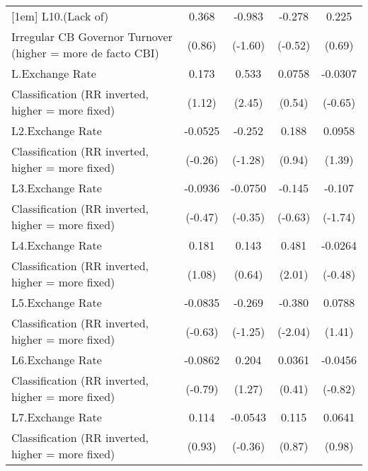 {\begin{tabular}{l*{4}{c}}
[1em]
L10.(Lack of)       &       0.368         &      -0.983         &      -0.278         &       0.225         \\
Irregular CB Governor Turnover (higher = more de facto CBI)&      (0.86)         &     (-1.60)         &     (-0.52)         &      (0.69)         \\
[1em]
L.Exchange Rate     &       0.173         &       0.533\sym{*}  &      0.0758         &     -0.0307         \\
Classification (RR inverted, higher = more fixed)&      (1.12)         &      (2.45)         &      (0.54)         &     (-0.65)         \\
[1em]
L2.Exchange Rate    &     -0.0525         &      -0.252         &       0.188         &      0.0958         \\
Classification (RR inverted, higher = more fixed)&     (-0.26)         &     (-1.28)         &      (0.94)         &      (1.39)         \\
[1em]
L3.Exchange Rate    &     -0.0936         &     -0.0750         &      -0.145         &      -0.107         \\
Classification (RR inverted, higher = more fixed)&     (-0.47)         &     (-0.35)         &     (-0.63)         &     (-1.74)         \\
[1em]
L4.Exchange Rate    &       0.181         &       0.143         &       0.481\sym{*}  &     -0.0264         \\
Classification (RR inverted, higher = more fixed)&      (1.08)         &      (0.64)         &      (2.01)         &     (-0.48)         \\
[1em]
L5.Exchange Rate    &     -0.0835         &      -0.269         &      -0.380\sym{*}  &      0.0788         \\
Classification (RR inverted, higher = more fixed)&     (-0.63)         &     (-1.25)         &     (-2.04)         &      (1.41)         \\
[1em]
L6.Exchange Rate    &     -0.0862         &       0.204         &      0.0361         &     -0.0456         \\
Classification (RR inverted, higher = more fixed)&     (-0.79)         &      (1.27)         &      (0.41)         &     (-0.82)         \\
[1em]
L7.Exchange Rate    &       0.114         &     -0.0543         &       0.115         &      0.0641         \\
Classification (RR inverted, higher = more fixed)&      (0.93)         &     (-0.36)         &      (0.87)         &      (0.98)         \\

\end{tabular}}
